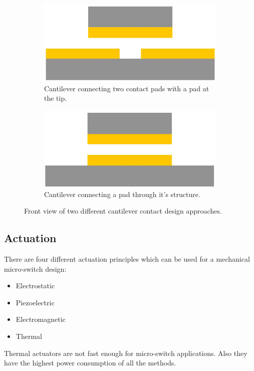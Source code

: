 \begin{figure}[h]
\begin{subfigure}{.5\textwidth}
  \centering
  \includegraphics[width=.8\linewidth]{fig/cant_double_front.jpg}
  \caption{Cantilever connecting two contact pads with a pad at the tip.}
  \label{fig:cantilever_connect_pad}
\end{subfigure}%
\begin{subfigure}{.5\textwidth}
  \centering
  \includegraphics[width=.8\linewidth]{fig/cant_single_front.jpg}
  \caption{Cantilever connecting a pad through it's structure.}
  \label{fig:cantilever_connect_through}
\end{subfigure}
\caption{Front view of two different cantilever contact design approaches.}
\label{fig:cantilever_2_designs}
\end{figure}

\subsection{Actuation}
\label{sec:actuation}
There are four different actuation principles which can be used for a mechanical micro-switch design:
\begin{itemize}
  \item Electrostatic
  \item Piezoelectric
  \item Electromagnetic
  \item Thermal
\end{itemize}

Thermal actuators are not fast enough for micro-switch applications. 
Also they have the highest power consumption of all the methods.

